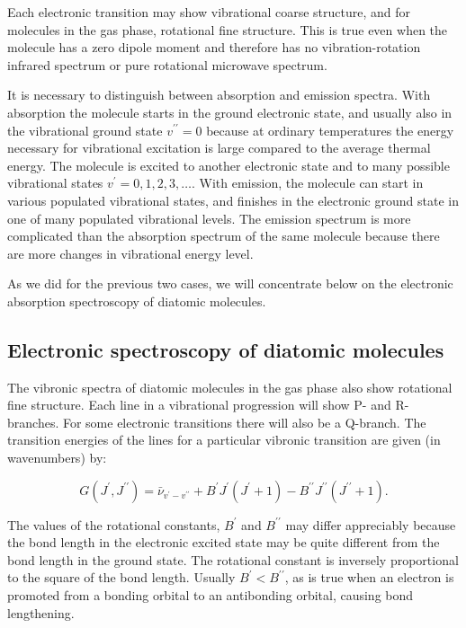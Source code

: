 \documentclass[
  9pt,
]{extbook}
\theoremstyle{definition}
\theoremstyle{definition}
\theoremstyle{definition}
\theoremstyle{remark}
\begin{document}
Each electronic transition may show vibrational coarse structure, and for molecules in the gas phase, rotational fine structure. This is true even when the molecule has a zero dipole moment and therefore has no vibration-rotation infrared spectrum or pure rotational microwave spectrum.

It is necessary to distinguish between absorption and emission spectra. With absorption the molecule starts in the ground electronic state, and usually also in the vibrational ground state \(v^{\prime\prime}=0\) because at ordinary temperatures the energy necessary for vibrational excitation is large compared to the average thermal energy. The molecule is excited to another electronic state and to many possible vibrational states \(v^{\prime}=0,1,2,3,\ldots\). With emission, the molecule can start in various populated vibrational states, and finishes in the electronic ground state in one of many populated vibrational levels. The emission spectrum is more complicated than the absorption spectrum of the same molecule because there are more changes in vibrational energy level.

As we did for the previous two cases, we will concentrate below on the electronic absorption spectroscopy of diatomic molecules.

\hypertarget{electronic-spectroscopy-of-diatomic-molecules}{%
\subsection{Electronic spectroscopy of diatomic molecules}\label{electronic-spectroscopy-of-diatomic-molecules}}

The vibronic spectra of diatomic molecules in the gas phase also show rotational fine structure. Each line in a vibrational progression will show P- and R- branches. For some electronic transitions there will also be a Q-branch. The transition energies of the lines for a particular vibronic transition are given (in wavenumbers) by:

\begin{equation}
G(J^{\prime },J^{{\prime \prime }})={\bar  \nu }_{{v^{\prime }-v^{{\prime \prime }}}}+B^{\prime }J^{\prime }(J^{\prime }+1)-B^{{\prime \prime }}J^{{\prime \prime }}(J^{{\prime \prime }}+1).
\label{eq:elec1}
\end{equation}

The values of the rotational constants, \(B^{\prime}\) and \(B^{\prime\prime}\) may differ appreciably because the bond length in the electronic excited state may be quite different from the bond length in the ground state. The rotational constant is inversely proportional to the square of the bond length. Usually \(B^{\prime}<B^{\prime\prime}\), as is true when an electron is promoted from a bonding orbital to an antibonding orbital, causing bond lengthening.
\end{document}
